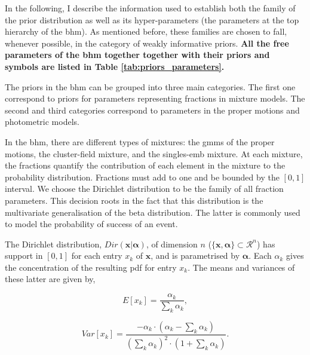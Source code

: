 In the following, I describe the information used to establish both the family of the prior distribution as well as its hyper-parameters (the parameters at the top hierarchy of the \gls{bhm}). As mentioned before, these families are chosen to fall, whenever possible, in the category of weakly informative priors. \textbf{All the free parameters of the \gls{bhm} together together with their priors and symbols are listed in Table \ref{tab:priors_parameters}.}


The priors in the \gls{bhm} can be grouped into three main categories. The first one correspond to priors for parameters representing fractions in mixture models. The second and third categories correspond to parameters in the proper motions and photometric models. 

In the \gls{bhm}, there are different types of mixtures: the \glspl{gmm} of the proper motions, the cluster-field mixture, and the singles-\gls{emb} mixture. At each mixture, the fractions quantify the contribution of each element in the mixture to the probability distribution. Fractions must add to one and be bounded by the $[0,1]$ interval.  We choose the Dirichlet distribution to be the family of all fraction parameters. This decision roots in the fact that this distribution is the multivariate generalisation of the beta distribution. The latter is commonly used to model the probability of success of an event.

{The Dirichlet distribution, $Dir(\mathbf{x}|\boldsymbol{\alpha})$, of dimension $n$ ($\{\mathbf{x},\boldsymbol{\alpha}\} \subset \mathcal{R}^n$) has support in $[0,1]$ for each entry $x_k$ of $\mathbf{x}$, and is parametrised by $\boldsymbol{\alpha}$. Each $\alpha_k$ gives the concentration of the resulting \gls{pdf} for entry $x_k$. The means and variances of these latter are given by,}

\begin{equation}
E[x_k]=\frac{\alpha_k}{\sum_k \alpha_k},
\end{equation}

\begin{equation}
Var[x_k]=\frac{-\alpha_k\cdot (\alpha_k -\sum_k \alpha_k)}{(\sum_k \alpha_k)^2 \cdot (1+\sum_k \alpha_k)}.
\end{equation}

